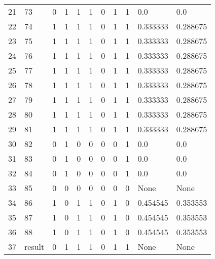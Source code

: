 \begin{tabular}{lllllllllll}
21 &      73 &  0 &  1 &  1 &  1 &  0 &  1 &  1 &        0.0 &       0.0 \\
22 &      74 &  1 &  1 &  1 &  1 &  0 &  1 &  1 &   0.333333 &  0.288675 \\
23 &      75 &  1 &  1 &  1 &  1 &  0 &  1 &  1 &   0.333333 &  0.288675 \\
24 &      76 &  1 &  1 &  1 &  1 &  0 &  1 &  1 &   0.333333 &  0.288675 \\
25 &      77 &  1 &  1 &  1 &  1 &  0 &  1 &  1 &   0.333333 &  0.288675 \\
26 &      78 &  1 &  1 &  1 &  1 &  0 &  1 &  1 &   0.333333 &  0.288675 \\
27 &      79 &  1 &  1 &  1 &  1 &  0 &  1 &  1 &   0.333333 &  0.288675 \\
28 &      80 &  1 &  1 &  1 &  1 &  0 &  1 &  1 &   0.333333 &  0.288675 \\
29 &      81 &  1 &  1 &  1 &  1 &  0 &  1 &  1 &   0.333333 &  0.288675 \\
30 &      82 &  0 &  1 &  0 &  0 &  0 &  0 &  1 &        0.0 &       0.0 \\
31 &      83 &  0 &  1 &  0 &  0 &  0 &  0 &  1 &        0.0 &       0.0 \\
32 &      84 &  0 &  1 &  0 &  0 &  0 &  0 &  1 &        0.0 &       0.0 \\
33 &      85 &  0 &  0 &  0 &  0 &  0 &  0 &  0 &       None &      None \\
34 &      86 &  1 &  0 &  1 &  1 &  0 &  1 &  0 &   0.454545 &  0.353553 \\
35 &      87 &  1 &  0 &  1 &  1 &  0 &  1 &  0 &   0.454545 &  0.353553 \\
36 &      88 &  1 &  0 &  1 &  1 &  0 &  1 &  0 &   0.454545 &  0.353553 \\
37 &  result &  0 &  1 &  1 &  1 &  0 &  1 &  1 &       None &      None \\
\bottomrule
\end{tabular}
